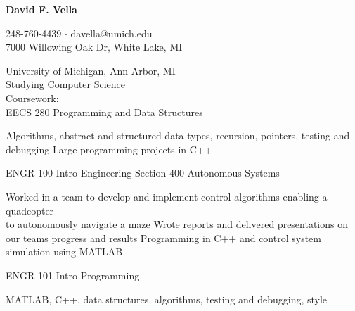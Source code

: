 




\begin{center}
    {\Large \textbf{David F. Vella} \par}
    \vspace{5pt}
    248-760-4439 $\cdot$ davella@umich.edu \\
    7000 Willowing Oak Dr, White Lake, MI \\
\end{center}
\vspace{-10pt}


\begin{rsection}
    University of Michigan, Ann Arbor, MI  \\
    Studying Computer Science 
    \vspace{5pt} \\
    \noindent Coursework: \\
    EECS 280 Programming and Data Structures 
    \begin{rlist}
        \ritem Algorithms, abstract and structured data types, recursion, pointers, testing and debugging
        \ritem Large programming projects in C++
    \end{rlist}
    ENGR 100 Intro Engineering Section 400 Autonomous Systems 
    \begin{rlist}
        \ritem Worked in a team to develop and implement control algorithms enabling a quadcopter \\ to autonomously navigate a maze
        \ritem Wrote reports and delivered presentations on our teams progress and results
        \ritem Programming in C++ and control system simulation using MATLAB 
    \end{rlist}
    ENGR 101 Intro Programming 
    \begin{rlist}
        \ritem MATLAB, C++, data structures, algorithms, testing and debugging, style 
    \end{rlist}
\end{rsection}


